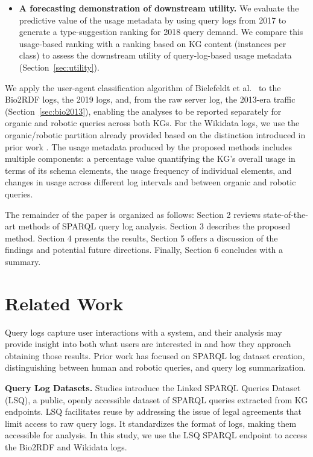 \documentclass[sw]{iosart2x}
\begin{document}
\begin{itemize}
\item \textbf{A forecasting demonstration of downstream utility.} We evaluate the predictive value of the usage metadata by using query logs from 2017 to generate a type-suggestion ranking for 2018 query demand. We compare this usage-based ranking with a ranking based on KG content (instances per class) to assess the downstream utility of query-log-based usage metadata (Section~\ref{sec:utility}).

\end{itemize}
We apply the user-agent classification algorithm of Bielefeldt et al.\ \cite{bielefeldt2018practical} to the Bio2RDF logs, the 2019 logs, and, from the raw server log, the 2013-era traffic (Section~\ref{sec:bio2013}), enabling the analyses to be reported separately for organic and robotic queries across both KGs. For the Wikidata logs, we use the organic/robotic partition already provided based on the distinction introduced in prior work \cite{malyshev2018getting,bielefeldt2018practical}. The usage metadata produced by the proposed methods includes multiple components: a percentage value quantifying the KG's overall usage in terms of its schema elements, the usage frequency of individual elements, and changes in usage across different log intervals and between organic and robotic queries.

The remainder of the paper is organized as follows: Section 2 reviews state-of-the-art methods of SPARQL query log analysis. Section 3 describes the proposed method. Section 4 presents the results, Section 5 offers a discussion of the findings and potential future directions. Finally, Section 6 concludes with a summary.

\section{Related Work}\label{s2}

Query logs capture user interactions with a system, and their analysis may provide insight into both what users are interested in and how they approach obtaining those results.  Prior work has focused on SPARQL log dataset creation, distinguishing between human and robotic queries, and query log summarization.

\textbf{Query Log Datasets.}
Studies \cite{saleem2015lsq,stadler2024lsq} introduce the Linked SPARQL Queries Dataset (LSQ), a public, openly accessible dataset of SPARQL queries extracted from KG endpoints. LSQ facilitates reuse by addressing the issue of legal agreements that limit access to raw query logs. It standardizes the format of logs, making them accessible for analysis. In this study, we use the LSQ SPARQL endpoint to access the Bio2RDF and Wikidata logs.
\end{document}
